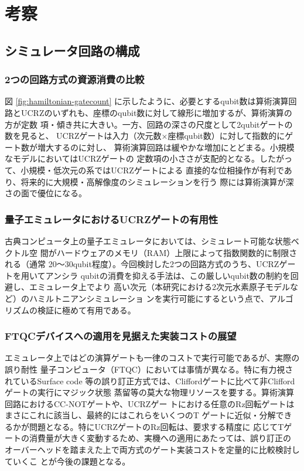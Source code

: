 \documentclass[wabun2025.tex]{subfiles}
\begin{document}
\section{考察}
\label{sec:analysis}
\subsection{シミュレータ回路の構成}
\label{sec:circuit-structure-analysis}
\subsubsection{2つの回路方式の資源消費の比較}
図 \ref{fig:hamiltonian-gatecount} に示したように、必要とするqubit数は算術演算回
路とUCRZのいずれも、座標のqubit数に対して線形に増加するが、算術演算の方が定数
項・傾き共に大きい。一方、回路の深さの尺度として2qubitゲートの数を見ると、
UCRZゲートは入力（次元数×座標qubit数）に対して指数的にゲート数が増大するのに対し、
算術演算回路は緩やかな増加にとどまる。小規模なモデルにおいてはUCRZゲートの
定数項の小ささが支配的となる。したがって、小規模・低次元の系ではUCRZゲートによる
直接的な位相操作が有利であり、将来的に大規模・高解像度のシミュレーションを行う
際には算術演算が深さの面で優位になる。

\subsubsection{量子エミュレータにおけるUCRZゲートの有用性}
古典コンピュータ上の量子エミュレータにおいては、シミュレート可能な状態ベクトル空
間がハードウェアのメモリ（RAM）上限によって指数関数的に制限される（通常
20〜30qubit程度）。今回検討した2つの回路方式のうち、UCRZゲートを用いてアンシラ
qubitの消費を抑える手法は、この厳しいqubit数の制約を回避し、エミュレータ上でより
高い次元（本研究における2次元水素原子モデルなど）のハミルトニアンシミュレーショ
ンを実行可能にするという点で、アルゴリズムの検証に極めて有用である。

\subsubsection{FTQCデバイスへの適用を見据えた実装コストの展望}
エミュレータ上ではどの演算ゲートも一律のコストで実行可能であるが、実際の誤り耐性
量子コンピュータ（FTQC）においては事情が異なる。特に有力視されているSurface code
等の誤り訂正方式では、Cliffordゲートに比べて非Cliffordゲートの実行にマジック状態
蒸留等の莫大な物理リソースを要する。算術演算回路におけるCC-NOTゲートや、UCRZゲー
トにおける任意のRz回転ゲートはまさにこれに該当し、最終的にはこれらをいくつのT
ゲートに近似・分解できるかが問題となる。特にUCRZゲートのRz回転は、要求する精度に
応じてTゲートの消費量が大きく変動するため、実機への適用にあたっては、誤り訂正の
オーバーヘッドを踏まえた上で両方式のゲート実装コストを定量的に比較検討していくこ
とが今後の課題となる。
\end{document}
